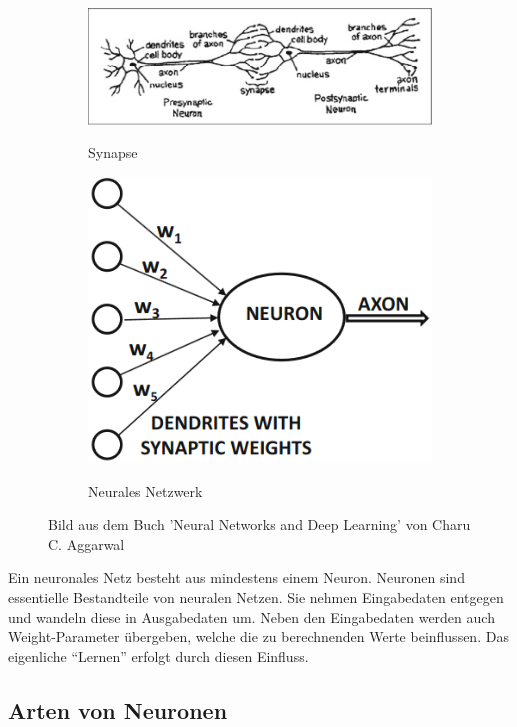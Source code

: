 \begin{figure}[H]
\begin{subfigure}{0.6\textwidth}
    \includegraphics[width=\textwidth]{Sources/01-01_synapse.png}
    \label{Synapse}
    \caption{Synapse}
\end{subfigure}
\begin{subfigure}{0.25\textwidth}
    \includegraphics[width=\textwidth]{Sources/01-02_neuron.png}
    \label{Neuron}
    \caption{Neurales Netzwerk}
\end{subfigure}
\caption{Bild aus dem Buch 'Neural Networks and Deep Learning' von Charu C. Aggarwal
}
\end{figure}
\noindent
Ein neuronales Netz besteht aus mindestens einem Neuron. Neuronen sind essentielle Bestandteile von neuralen Netzen. Sie nehmen Eingabedaten entgegen und wandeln diese 
in Ausgabedaten um. Neben den Eingabedaten werden auch Weight-Parameter übergeben, welche die zu berechnenden Werte beinflussen. Das eigenliche \enquote{Lernen} erfolgt durch diesen 
Einfluss.
\subsection{Arten von Neuronen}\label{subsec:neuronen:arten_von_neuronen}
